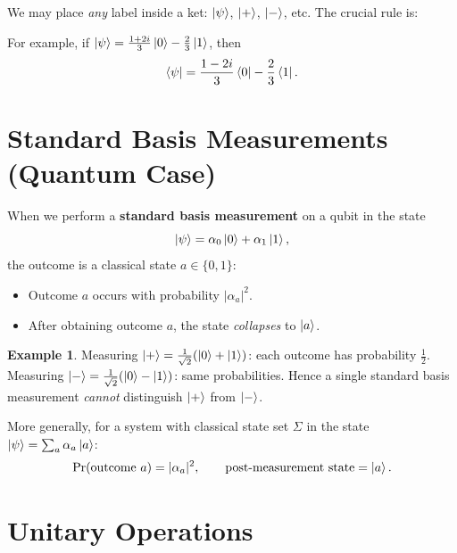 \documentclass[11pt]{article}
\theoremstyle{definition}
\newtheorem{example}{Example}[section]
\begin{document}
We may place \emph{any} label inside a ket: $\ket{\psi}$, $\ket{+}$, $\ket{-}$, etc.  The crucial rule is:

\begin{center}
\end{center}

For example, if $\ket{\psi}=\frac{1+2i}{3}\ket{0}-\frac{2}{3}\ket{1}$, then
\[
    \bra{\psi} = \frac{1-2i}{3}\bra{0} - \frac{2}{3}\bra{1}.
\]

\section{Standard Basis Measurements (Quantum Case)}

When we perform a \textbf{standard basis measurement} on a qubit in the state
\[
    \ket{\psi} = \alpha_0\ket{0}+\alpha_1\ket{1},
\]
the outcome is a classical state $a\in\{0,1\}$:
\begin{itemize}
    \item Outcome $a$ occurs with probability $|\alpha_a|^2$.
    \item After obtaining outcome $a$, the state \emph{collapses} to $\ket{a}$.
\end{itemize}

\begin{example}
Measuring $\ket{+}=\frac{1}{\sqrt{2}}(\ket{0}+\ket{1})$: each outcome has probability $\tfrac{1}{2}$.  Measuring $\ket{-}=\frac{1}{\sqrt{2}}(\ket{0}-\ket{1})$: same probabilities.  Hence a single standard basis measurement \emph{cannot} distinguish $\ket{+}$ from $\ket{-}$.
\end{example}

More generally, for a system with classical state set $\Sigma$ in the state $\ket{\psi}=\sum_a\alpha_a\ket{a}$:
\[
    \Pr(\text{outcome } a) = |\alpha_a|^2, \qquad \text{post-measurement state} = \ket{a}.
\]

\section{Unitary Operations}
\end{document}
